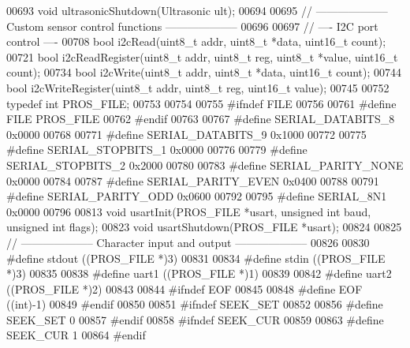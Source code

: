 \begin{DoxyCode}
00693 \textcolor{keywordtype}{void} ultrasonicShutdown(Ultrasonic ult);
00694 
00695 \textcolor{comment}{// -------------------- Custom sensor control functions --------------------}
00696 
00697 \textcolor{comment}{// ---- I2C port control ----}
00708 \textcolor{comment}{}\textcolor{keywordtype}{bool} i2cRead(uint8\_t addr, uint8\_t *data, uint16\_t count);
00721 \textcolor{keywordtype}{bool} i2cReadRegister(uint8\_t addr, uint8\_t reg, uint8\_t *value, uint16\_t count);
00734 \textcolor{keywordtype}{bool} i2cWrite(uint8\_t addr, uint8\_t *data, uint16\_t count);
00744 \textcolor{keywordtype}{bool} i2cWriteRegister(uint8\_t addr, uint8\_t reg, uint16\_t value);
00745 
00752 \textcolor{keyword}{typedef} \textcolor{keywordtype}{int} PROS_FILE;
00753 
00754 
00755 \textcolor{preprocessor}{#ifndef FILE}
00756 
00761 \textcolor{preprocessor}{#define FILE PROS\_FILE}
00762 \textcolor{preprocessor}{#endif}
00763 
00767 \textcolor{preprocessor}{#define SERIAL\_DATABITS\_8 0x0000}
00768 
00771 \textcolor{preprocessor}{#define SERIAL\_DATABITS\_9 0x1000}
00772 
00775 \textcolor{preprocessor}{#define SERIAL\_STOPBITS\_1 0x0000}
00776 
00779 \textcolor{preprocessor}{#define SERIAL\_STOPBITS\_2 0x2000}
00780 
00783 \textcolor{preprocessor}{#define SERIAL\_PARITY\_NONE 0x0000}
00784 
00787 \textcolor{preprocessor}{#define SERIAL\_PARITY\_EVEN 0x0400}
00788 
00791 \textcolor{preprocessor}{#define SERIAL\_PARITY\_ODD 0x0600}
00792 
00795 \textcolor{preprocessor}{#define SERIAL\_8N1 0x0000}
00796 
00813 \textcolor{keywordtype}{void} usartInit(PROS_FILE *usart, \textcolor{keywordtype}{unsigned} \textcolor{keywordtype}{int} baud, \textcolor{keywordtype}{unsigned} \textcolor{keywordtype}{int} flags);
00823 \textcolor{keywordtype}{void} usartShutdown(PROS_FILE *usart);
00824 
00825 \textcolor{comment}{// -------------------- Character input and output --------------------}
00826 
00830 \textcolor{preprocessor}{#define stdout ((PROS\_FILE *)3)}
00831 
00834 \textcolor{preprocessor}{#define stdin ((PROS\_FILE *)3)}
00835 
00838 \textcolor{preprocessor}{#define uart1 ((PROS\_FILE *)1)}
00839 
00842 \textcolor{preprocessor}{#define uart2 ((PROS\_FILE *)2)}
00843 
00844 \textcolor{preprocessor}{#ifndef EOF}
00845 
00848 \textcolor{preprocessor}{#define EOF ((int)-1)}
00849 \textcolor{preprocessor}{#endif}
00850 
00851 \textcolor{preprocessor}{#ifndef SEEK\_SET}
00852 
00856 \textcolor{preprocessor}{#define       SEEK\_SET 0}
00857 \textcolor{preprocessor}{#endif}
00858 \textcolor{preprocessor}{#ifndef SEEK\_CUR}
00859 
00863 \textcolor{preprocessor}{#define       SEEK\_CUR 1}
00864 \textcolor{preprocessor}{#endif}

\end{DoxyCode}
